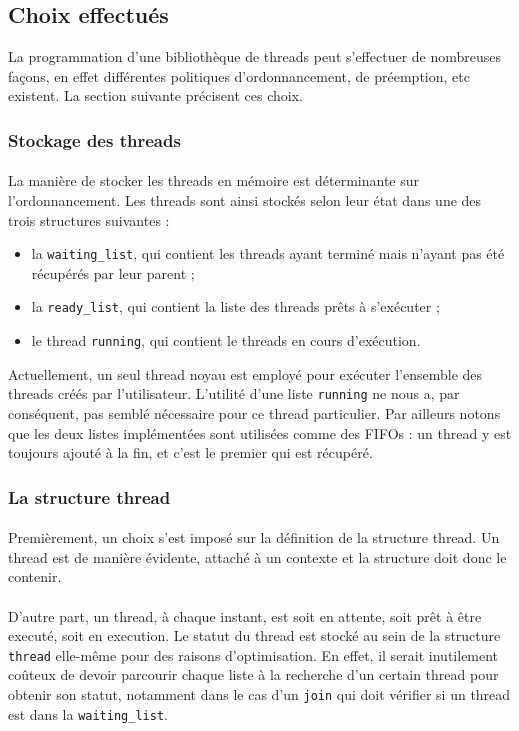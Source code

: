\subsection{Choix effectués}

La programmation d'une bibliothèque de threads peut s'effectuer de nombreuses façons, en effet différentes politiques d'ordonnancement, de préemption, etc existent. La section suivante précisent ces choix.

\subsubsection{Stockage des threads}

\paragraph{}
La manière de stocker les threads en mémoire est déterminante sur l'ordonnancement. Les threads sont ainsi stockés selon leur état dans une des trois structures suivantes :
\begin{itemize}
\item la \texttt{waiting\_list}, qui contient les threads ayant terminé mais n'ayant pas été récupérés par leur parent ;
\item la \texttt{ready\_list}, qui contient la liste des threads prêts à s'exécuter ;
\item le thread \texttt{running}, qui contient le threads en cours d'exécution.
\end{itemize}
Actuellement, un seul thread noyau est employé pour exécuter l'ensemble des threads créés par l'utilisateur. L'utilité d'une liste \texttt{running} ne nous a, par conséquent, pas semblé nécessaire pour ce thread particulier. Par ailleurs notons que les deux listes implémentées sont utilisées comme des FIFOs : un thread y est toujours ajouté à la fin, et c'est le premier qui est récupéré.

\subsubsection{La structure thread}

\paragraph{}
Premièrement, un choix s'est imposé sur la définition de la structure thread. Un thread est de manière évidente, attaché à un contexte et la structure doit donc le contenir.
\paragraph{}
D'autre part, un thread, à chaque instant, est soit en attente, soit prêt à être executé, soit en execution. Le statut du thread est stocké au sein de la structure \texttt{thread} elle-même pour des raisons d'optimisation. En effet, il serait inutilement coûteux de devoir parcourir chaque liste à la recherche d'un certain thread pour obtenir son statut, notamment dans le cas d'un \texttt{join} qui doit vérifier si un thread est dans la \texttt{waiting\_list}. 
